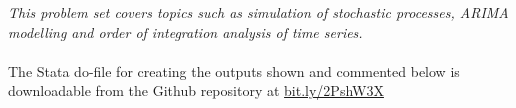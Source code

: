 \textit{This problem set covers topics such as simulation of stochastic processes, ARIMA
modelling and order of integration analysis of time series.}
\\ \\
The Stata do-file for creating the outputs shown and commented below is downloadable from the Github repository at \href{https://bit.ly/2PshW3X}{bit.ly/2PshW3X}

